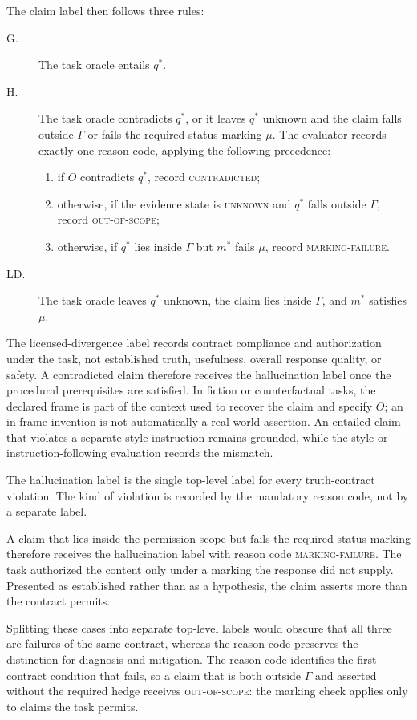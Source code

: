\documentclass{clv2025}
\newcommand{\LD}{\textsc{LD}}
\newcommand{\Hall}{\textsc{H}}
\newcommand{\Grd}{\textsc{G}}
\begin{document}
The claim label then follows three rules:
\begin{description}
  \item[\Grd.] The task oracle entails $q^*$.
  \item[\Hall.] The task oracle contradicts $q^*$, or it leaves $q^*$
        unknown and the claim falls outside $\Gamma$ or fails the required
        status marking $\mu$. The evaluator records exactly one reason code,
        applying the following precedence:
        \begin{enumerate}
          \item if $O$ contradicts $q^*$, record \textsc{contradicted};
          \item otherwise, if the evidence state is \textsc{unknown} and $q^*$
                falls outside $\Gamma$, record \textsc{out-of-scope};
          \item otherwise, if $q^*$ lies inside $\Gamma$ but $m^*$ fails
                $\mu$, record \textsc{marking-failure}.
        \end{enumerate}
  \item[\LD.] The task oracle leaves $q^*$ unknown, the claim lies
        inside $\Gamma$, and $m^*$ satisfies $\mu$.
\end{description}
The licensed-divergence label records contract compliance and authorization
under the task, not established truth, usefulness, overall response quality, or
safety. A contradicted claim therefore receives the hallucination label once
the procedural prerequisites are satisfied. In fiction or counterfactual tasks,
the declared frame is part of the context used to recover the claim and specify
$O$; an in-frame invention is not automatically a real-world assertion. An
entailed claim that violates a separate style instruction remains grounded,
while the style or instruction-following evaluation records the mismatch.

The hallucination label is the single top-level label for every truth-contract
violation. The kind of violation is recorded by the mandatory reason code, not
by a separate label.

A claim that lies inside the permission scope but fails the required status
marking therefore receives the hallucination label with reason code
\textsc{marking-failure}. The task authorized the content only under a marking
the response did not supply. Presented as established rather than as a
hypothesis, the claim asserts more than the contract permits.

Splitting these cases into separate top-level labels would obscure that all
three are failures of the same contract, whereas the reason code preserves the
distinction for diagnosis and mitigation.
The reason code identifies the first contract condition that fails, so a claim
that is both outside $\Gamma$ and asserted without the required hedge
receives \textsc{out-of-scope}: the marking check applies only to claims the
task permits.
\end{document}
